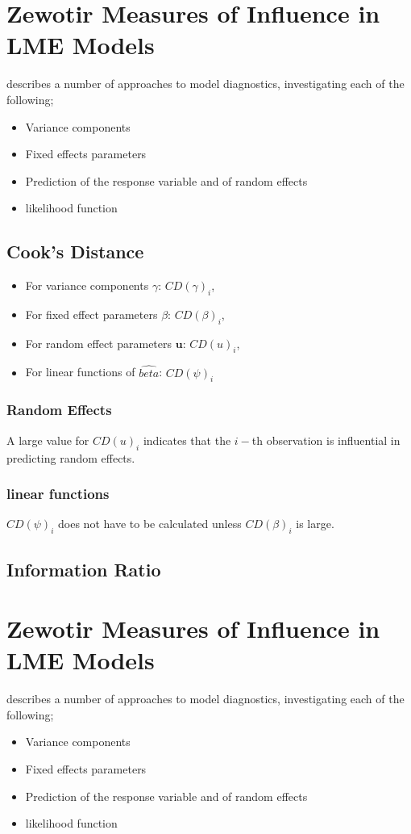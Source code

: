 \documentclass[12pt, a4paper]{article}
\begin{document}
\section{Zewotir Measures of Influence in LME Models}%
\citet{Zewotir} describes a number of approaches to model diagnostics, investigating each of the following;
\begin{itemize}
	\item Variance components
	\item Fixed effects parameters
	\item Prediction of the response variable and of random effects
	\item likelihood function
\end{itemize}

\subsection{Cook's Distance}
\begin{itemize}
	\item For variance components $\gamma$: $CD(\gamma)_i$,
	\item For fixed effect parameters $\beta$: $CD(\beta)_i$,
	\item For random effect parameters $\boldsymbol{u}$: $CD(u)_i$,
	\item For linear functions of $\hat{beta}$: $CD(\psi)_i$
\end{itemize}


\subsubsection{Random Effects}

A large value for $CD(u)_i$ indicates that the $i-$th observation is influential in predicting random effects.

\subsubsection{linear functions}

$CD(\psi)_i$ does not have to be calculated unless $CD(\beta)_i$ is large.


\subsection{Information Ratio}



	\section{Zewotir Measures of Influence in LME Models}
	\citet{Zewotir} describes a number of approaches to model diagnostics, investigating each of the following;
	\begin{itemize}
		\item Variance components
		\item Fixed effects parameters
		\item Prediction of the response variable and of random effects
		\item likelihood function
	\end{itemize}
	
\end{document}

